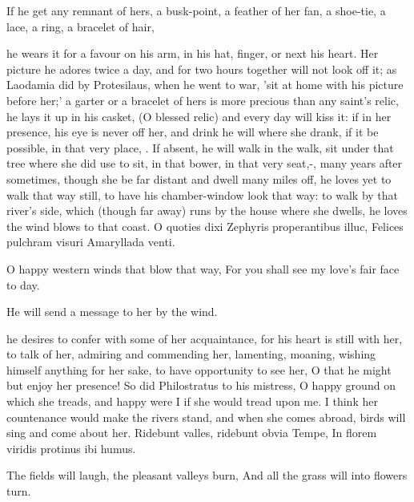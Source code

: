 If he get any remnant of hers, a busk-point, a feather of her fan, a
shoe-tie, a lace, a ring, a bracelet of hair,

he wears it for a favour on his arm, in his hat, finger, or next his
heart. Her picture he adores twice a day, and for two hours together
will not look off it; as Laodamia did by Protesilaus, when he went to
war, 'sit at home with his picture before her;' a garter or a
bracelet of hers is more precious than any saint's relic, he lays it up
in his casket, (O blessed relic) and every day will kiss it: if in her
presence, his eye is never off her, and drink he will where she drank,
if it be possible, in that very place, \etc{}. If absent, he will walk in
the walk, sit under that tree where she did use to sit, in that bower,
in that very seat,-, many years
after sometimes, though she be far distant and dwell many miles off, he
loves yet to walk that way still, to have his chamber-window look that
way: to walk by that river's side, which (though far away) runs by the
house where she dwells, he loves the wind blows to that coast.
O quoties dixi Zephyris properantibus illuc,
Felices pulchram visuri Amaryllada venti.

O happy western winds that blow that way,
For you shall see my love's fair face to day.

He will send a message to her by the wind.

he desires to confer with some of her acquaintance, for his heart
is still with her, to talk of her, admiring and commending her,
lamenting, moaning, wishing himself anything for her sake, to have
opportunity to see her, O that he might but enjoy her presence! So did
Philostratus to his mistress, O happy ground on which she treads,
and happy were I if she would tread upon me. I think her countenance
would make the rivers stand, and when she comes abroad, birds will sing
and come about her.
Ridebunt valles, ridebunt obvia Tempe,
In florem viridis protinus ibi humus.

The fields will laugh, the pleasant valleys burn,
And all the grass will into flowers turn.

